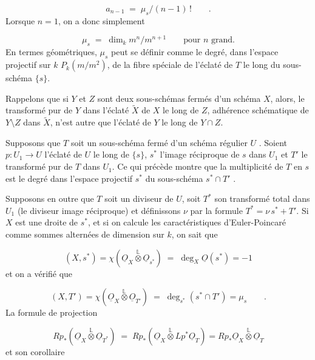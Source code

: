\begin{equation*}
a_{n-1} \;=\; \mu_s/(n-1)\, ! \qquad .
\end{equation*}
Lorsque $n = 1$, on a donc simplement

\begin{equation*}
\mu_s \;=\; \dim_k m^n/m^{n+1} \qquad \text{pour } n \text{ grand.}
\end{equation*}
En termes géométriques, $\mu_s$ peut se définir comme le degré, dans l'espace projectif sur $k$ $P_k(m/m^2)$, de la fibre spéciale de l'éclaté de $T$ le long du sous-schéma $\{s\}$.



Rappelons que si $Y$ et $Z$ sont deux sous-schémas fermés d'un schéma $X$, alors, le transformé pur de $Y$ dans l'éclaté $\tilde{X}$ de $X$ le long de $Z$, adhérence schématique de $Y \setminus Z$ dans $\tilde{X}$, n'est autre que l'éclaté de $Y$ le long de $Y \cap Z$.

Supposons que $T$ soit un sous-schéma fermé d'un schéma régulier $U$ . Soient $p : U_1 \longrightarrow U$ l'éclaté de $U$ le long de $\{s\}$, $s^*$ l'image réciproque de $s$ dans $U_1$ et $T'$ le transformé pur de $T$ dans $U_1$. Ce qui précède montre que la multiplicité de $T$ en $s$ est le degré dans l'espace projectif $s^*$ du sous-schéma $s^* \cap T'$ .

Supposons en outre que $T$ soit un diviseur de $U$, soit $T^*$ son transformé total dans $U_1$ (le diviseur image réciproque) et définissons $\nu$ par la formule $T^* = \nu\, s^* + T'$. Si $X$ est une droite de $s^*$, et si on calcule les caractéristiques d'Euler-Poincaré comme sommes alternées de dimension sur $k$, on sait que

\begin{equation}\tag{2.6.1}
(X,s^*) = \chi(\underline{O}_X \overset{\mathbb{L}}{\otimes} \underline{O}_{s^*}) \;=\; \deg_X \underline{O}(s^*) = -1
\end{equation}
et on a vérifié que

\begin{equation}\tag{2.6.2}
(X,T') = \chi(\underline{O}_X \overset{\mathbb{L}}{\otimes} \underline{O}_{T'}) \;=\; \deg_{s^*} (s^* \cap T') = \mu_s \qquad .
\end{equation}
La formule de projection

\begin{equation*}
Rp_*(\underline{O}_X \overset{\mathbb{L}}{\otimes} \underline{O}_{T^*}) \;=\; Rp_*(\underline{O}_X \overset{\mathbb{L}}{\otimes} Lp^* \underline{O}_T) = Rp_* \underline{O}_X \overset{\mathbb{L}}{\otimes} \underline{O}_T
\end{equation*}
et son corollaire


